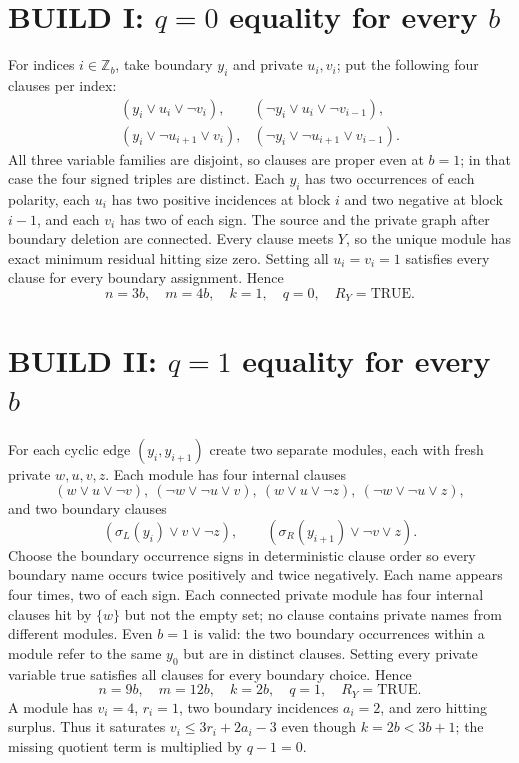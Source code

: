 \documentclass[11pt]{article}
\begin{document}
\section{BUILD I: $q=0$ equality for every $b$}
For indices $i\in\mathbb Z_b$, take boundary $y_i$ and private $u_i,v_i$; put the following four clauses per index:
\[
\begin{array}{ll}
(y_i\lor u_i\lor\neg v_i),&
(\neg y_i\lor u_i\lor\neg v_{i-1}),\\
(y_i\lor\neg u_{i+1}\lor v_i),&
(\neg y_i\lor\neg u_{i+1}\lor v_{i-1}).
\end{array}
\]
All three variable families are disjoint, so clauses are proper even at $b=1$; in that case the four signed triples are distinct. Each $y_i$ has two occurrences of each polarity, each $u_i$ has two positive incidences at block $i$ and two negative at block $i-1$, and each $v_i$ has two of each sign. The source and the private graph after boundary deletion are connected. Every clause meets $Y$, so the unique module has exact minimum residual hitting size zero. Setting all $u_i=v_i=1$ satisfies every clause for every boundary assignment. Hence
\[
\boxed{n=3b,\quad m=4b,\quad k=1,\quad q=0,\quad R_Y=\mathrm{TRUE}.}
\]

\section{BUILD II: $q=1$ equality for every $b$}
For each cyclic edge $(y_i,y_{i+1})$ create two separate modules, each with fresh private $w,u,v,z$. Each module has four internal clauses
\[
(w\lor u\lor\neg v),\
(\neg w\lor\neg u\lor v),\
(w\lor u\lor\neg z),\
(\neg w\lor\neg u\lor z),
\]
and two boundary clauses
\[
(\sigma_L(y_i)\lor v\lor\neg z),\qquad
(\sigma_R(y_{i+1})\lor\neg v\lor z).
\]
Choose the boundary occurrence signs in deterministic clause order so every boundary name occurs twice positively and twice negatively. Each name appears four times, two of each sign. Each connected private module has four internal clauses hit by $\{w\}$ but not the empty set; no clause contains private names from different modules. Even $b=1$ is valid: the two boundary occurrences within a module refer to the same $y_0$ but are in distinct clauses. Setting every private variable true satisfies all clauses for every boundary choice. Hence
\[
\boxed{n=9b,\quad m=12b,\quad k=2b,\quad q=1,\quad R_Y=\mathrm{TRUE}.}
\]
A module has $v_i=4$, $r_i=1$, two boundary incidences $a_i=2$, and zero hitting surplus. Thus it saturates $v_i\le3r_i+2a_i-3$ even though $k=2b<3b+1$; the missing quotient term is multiplied by $q-1=0$.
\end{document}
